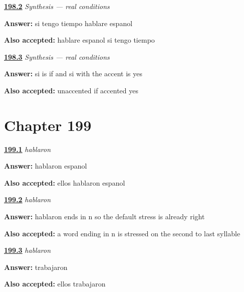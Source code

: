 \noindent\begin{minipage}[t]{\linewidth}
\raggedright
\hyperlink{review-ES-C55-sintesis-condicion-plan}{\textbf{198.2}} \emph{Synthesis — real conditions}\par
\small \textbf{Answer:} si tengo tiempo hablare espanol\par
\footnotesize \textbf{Also accepted:} hablare espanol si tengo tiempo
\end{minipage}\par\medskip

\noindent\begin{minipage}[t]{\linewidth}
\raggedright
\hyperlink{review-ES-C55-sintesis-condicion-two}{\textbf{198.3}} \emph{Synthesis — real conditions}\par
\small \textbf{Answer:} si is if and si with the accent is yes\par
\footnotesize \textbf{Also accepted:} unaccented if accented yes
\end{minipage}\par\medskip

\section*{Chapter 199}

\noindent\begin{minipage}[t]{\linewidth}
\raggedright
\hyperlink{review-ES-C55-hablaron-say}{\textbf{199.1}} \emph{hablaron}\par
\small \textbf{Answer:} hablaron espanol\par
\footnotesize \textbf{Also accepted:} ellos hablaron espanol
\end{minipage}\par\medskip

\noindent\begin{minipage}[t]{\linewidth}
\raggedright
\hyperlink{review-ES-C55-hablaron-accent}{\textbf{199.2}} \emph{hablaron}\par
\small \textbf{Answer:} hablaron ends in n so the default stress is already right\par
\footnotesize \textbf{Also accepted:} a word ending in n is stressed on the second to last syllable
\end{minipage}\par\medskip

\noindent\begin{minipage}[t]{\linewidth}
\raggedright
\hyperlink{review-ES-C55-hablaron-build}{\textbf{199.3}} \emph{hablaron}\par
\small \textbf{Answer:} trabajaron\par
\footnotesize \textbf{Also accepted:} ellos trabajaron
\end{minipage}\par\medskip

